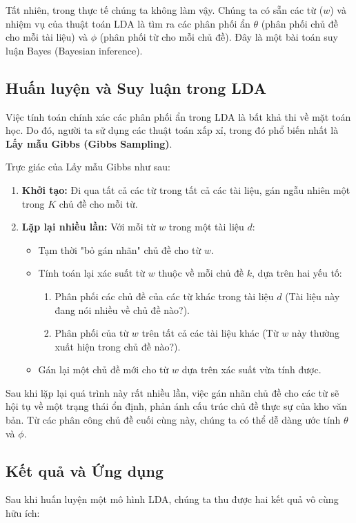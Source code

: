 Tất nhiên, trong thực tế chúng ta không làm vậy. Chúng ta có sẵn các từ ($w$) và nhiệm vụ của thuật toán LDA là tìm ra các phân phối ẩn $\theta$ (phân phối chủ đề cho mỗi tài liệu) và $\phi$ (phân phối từ cho mỗi chủ đề). Đây là một bài toán suy luận Bayes (Bayesian inference).

\subsection{Huấn luyện và Suy luận trong LDA}
Việc tính toán chính xác các phân phối ẩn trong LDA là bất khả thi về mặt toán học. Do đó, người ta sử dụng các thuật toán xấp xỉ, trong đó phổ biến nhất là \textbf{Lấy mẫu Gibbs (Gibbs Sampling)}.

Trực giác của Lấy mẫu Gibbs như sau:
\begin{enumerate}
    \item \textbf{Khởi tạo:} Đi qua tất cả các từ trong tất cả các tài liệu, gán ngẫu nhiên một trong $K$ chủ đề cho mỗi từ.
    \item \textbf{Lặp lại nhiều lần:} Với mỗi từ $w$ trong một tài liệu $d$:
        \begin{itemize}
            \item Tạm thời "bỏ gán nhãn" chủ đề cho từ $w$.
            \item Tính toán lại xác suất từ $w$ thuộc về mỗi chủ đề $k$, dựa trên hai yếu tố:
                \begin{enumerate}
                    \item Phân phối các chủ đề của các từ khác trong tài liệu $d$ (Tài liệu này đang nói nhiều về chủ đề nào?).
                    \item Phân phối của từ $w$ trên tất cả các tài liệu khác (Từ $w$ này thường xuất hiện trong chủ đề nào?).
                \end{enumerate}
            \item Gán lại một chủ đề mới cho từ $w$ dựa trên xác suất vừa tính được.
        \end{itemize}
\end{enumerate}
Sau khi lặp lại quá trình này rất nhiều lần, việc gán nhãn chủ đề cho các từ sẽ hội tụ về một trạng thái ổn định, phản ánh cấu trúc chủ đề thực sự của kho văn bản. Từ các phân công chủ đề cuối cùng này, chúng ta có thể dễ dàng ước tính $\theta$ và $\phi$.

\subsection{Kết quả và Ứng dụng}
Sau khi huấn luyện một mô hình LDA, chúng ta thu được hai kết quả vô cùng hữu ích:

